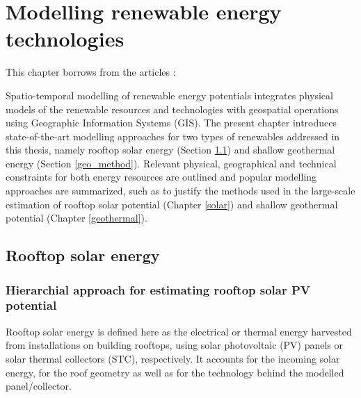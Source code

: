 
\chapter{Modelling renewable energy technologies}
\label{methods_physical}

\vspace{-15pt} %
\begin{tcolorbox}[enhanced,width=\textwidth,size=fbox,
        sharp corners,colframe=black!5!white,drop fuzzy shadow southeast,
        boxrule=3mm, parbox=false] 
        
This chapter borrows from the articles \citep{walch_big_2020,walch_quantifying_2021}:

\qquad {}

\qquad {}
\end{tcolorbox}

Spatio-temporal modelling of renewable energy potentials integrates physical models of the renewable resources and technologies with geospatial operations using Geographic Information Systems (GIS).
The present chapter introduces state-of-the-art modelling approaches for two types of renewables addressed in this thesis, namely rooftop solar energy (Section \ref{method_solar}) and shallow geothermal energy (Section \ref{geo_method}). 
Relevant physical, geographical and technical constraints for both energy resources are outlined and popular modelling approaches are summarized, such as to justify the methods used in the large-scale estimation of rooftop solar potential (Chapter \ref{solar}) and shallow geothermal potential (Chapter \ref{geothermal}).

\section{Rooftop solar energy}
\label{method_solar}

\subsection{Hierarchial approach for estimating rooftop solar PV potential}

Rooftop solar energy is defined here as the electrical or thermal energy harvested from installations on building rooftops, using solar photovoltaic (PV) panels or solar thermal collectors (STC), respectively. It accounts for the incoming solar energy, for the roof geometry as well as for the technology behind the modelled panel/collector. 

